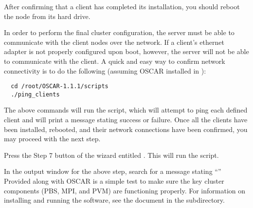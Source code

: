 After confirming that a client has completed its installation, you
should reboot the node from its hard drive. 


In order to perform the final cluster configuration, the server must
be able to communicate with the client nodes over the network. If a
client's ethernet adapter is not properly configured upon boot,
however, the server will not be able to communicate with the client. A
quick and easy way to confirm network connectivity is to do the
following (assuming OSCAR installed in ):

\begin{verbatim}
  cd /root/OSCAR-1.1.1/scripts
  ./ping_clients
\end{verbatim}

The above commands will run the  script, which will
attempt to ping each defined client and will print a message stating
success or failure. Once all the clients have been
installed, rebooted, and their network connections have been
confirmed, you may proceed with the next step.


Press the Step 7 button of the wizard entitled .  This will run the  script.


In the output window for the above step, search for a message stating
``''
Provided along with OSCAR is a simple test to make sure the key
cluster components (PBS, MPI, and PVM) are functioning properly. For
information on installing and running the software, see the
 document in the  subdirectory.

\endchange
